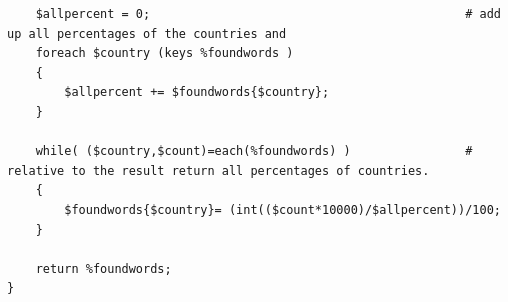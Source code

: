 \begin{verbatim}
    $allpercent = 0;                                            # add up all percentages of the countries and
    foreach $country (keys %foundwords )
    {
        $allpercent += $foundwords{$country};
    }

    while( ($country,$count)=each(%foundwords) )                # relative to the result return all percentages of countries.
    {
        $foundwords{$country}= (int(($count*10000)/$allpercent))/100;
    }
    
    return %foundwords;
}

\end{verbatim}

 








